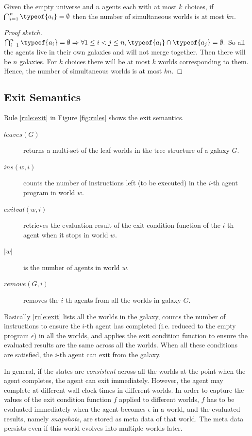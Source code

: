 \begin{proposition}
Given the empty universe and $n$ agents each with at most $k$ choices, 
if $\bigcap_{i=1}^n \typeof{a_i} = \emptyset$ then the number of simultaneous worlds is at most $kn$.
\end{proposition}
\begin{proof}[Proof sketch]
$\bigcap_{i=1}^n \typeof{a_i} = \emptyset \Rightarrow \forall 1\le i<j\le n, \typeof{a_i}\cap\typeof{a_j}=\emptyset.$
So all the agents live in their own galaxies and will not merge together. 
Then there will be $n$ galaxies. 
For $k$ choices there will be at most $k$ worlds corresponding to them. 
Hence, the number of simultaneous worlds is at most $kn$.
\end{proof}


\subsection{Exit Semantics}\label{sec:exit}

Rule \ref{rule:exit} in Figure \ref{fig:rules} shows the exit semantics.
\begin{description}
\item[$leaves(G)$] returns a multi-set of the leaf worlds in the tree structure of a galaxy $G$.
\item[$ins(w,i)$] counts the number of instructions left (to be executed) in the $i$-th agent program in world $w$.
\item[$exitval(w,i)$] retrieves the evaluation result of the exit condition function of the $i$-th agent when it stops in world $w$.
\item[$|w|$] is the number of agents in world $w$.
\item[$remove(G,i)$] removes the $i$-th agents from all the worlds in galaxy $G$.
\end{description}

Basically \ref{rule:exit} lists all the worlds in the galaxy, counts the number of instructions to ensure the $i$-th agent has completed (i.e. reduced to the empty program $\epsilon$) in all the worlds, and applies the exit condition function to ensure the evaluated results are the same across all the worlds.
When all these conditions are satisfied, the $i$-th agent can exit from the galaxy.

In general, if the states are \emph{consistent} across all the worlds at
the point when the agent completes, the agent can exit immediately.
However, the agent may complete at different wall clock times in different worlds.
In order to capture the values of the exit condition function $f$ applied to different worlds,
$f$ has to be evaluated immediately when the agent becomes $\epsilon$ in a world,
and the evaluated results, namely \emph{snapshots}, are stored as meta data of that world.
The meta data  persists even if this world evolves into multiple worlds later.

